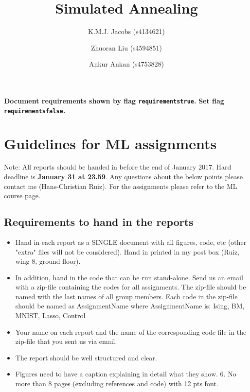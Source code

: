 \documentclass[10pt,a4paper]{article}
\author{K.M.J. Jacobs (s4134621) \and Zhuoran Liu (s4594851) \and Ankur Ankan (s4753828)}
\title{Simulated Annealing}
\newif\ifrequirements
\begin{document}
\maketitle

\ifrequirements
\color{red}
\textbf{Document requirements shown by flag \texttt{requirementstrue}.}
\textbf{Set flag \texttt{requirementsfalse}.}

\color{blue}
\section{Guidelines for ML assignments}
Note: All reports should be handed in before the end of January 2017. Hard deadline is \textbf{January 31 at 23.59}. Any questions about the below points please contact me (Hans-Christian Ruiz). For the assignments please refer to the ML course page.

\subsection{Requirements to hand in the reports}
\begin{itemize}
\item Hand in each report as a SINGLE document with all figures, code, etc (other "extra" files will not be considered). Hand in printed in my post box (Ruiz, wing 8, ground floor).
\item In addition, hand in the code that can be run stand-alone. Send us an email with a zip-file containing the codes for all assignments. The zip-file should be named with the last names of all group members. Each code in the zip-file should be named as AssignmentName where AssignmentName is: Ising, BM, MNIST, Lasso, Control
\item Your name on each report and the name of the corresponding code file in the zip-file that you sent us via email.
\item The report should be well structured and clear.
\item Figures need to have a caption explaining in detail what they show. 6. No more than 8 pages (excluding references and code) with 12 pts font.
\end{itemize}
\end{document}
